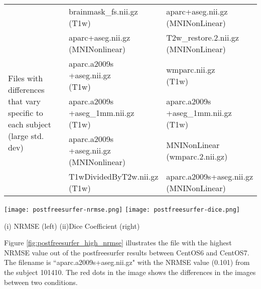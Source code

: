 \begin{center}
\begin{longtable}{|p{}|p{}|p{}|}
& \makecell[l]{brainmask\_fs.nii.gz\\(T1w)}  & \makecell[l]{aparc+aseg.nii.gz\\(MNINonLinear)} \\\cline{1-3}
\multirow{5}{.3\textwidth}{Files with differences that vary specific to each subject (large std. dev)}   & \makecell[l]{aparc+aseg.nii.gz\\(MNINonlinear)}  & \makecell[l]{T2w\_restore.2.nii.gz\\(MNINonLinear)} \\\cline{2-3}
& \makecell[l]{aparc.a2009s\\+aseg.nii.gz\\(T1w)}                              & \makecell[l]{wmparc.nii.gz\\(T1w)} \\\cline{2-3}
& \makecell[l]{aparc.a2009s\\+aseg\_1mm.nii.gz\\(T1w)}                         & \makecell[l]{aparc.a2009s\\+aseg\_1mm.nii.gz\\(T1w)} \\\cline{2-3}
& \makecell[l]{aparc.a2009s\\+aseg.nii.gz\\(MNINonlinear)}                   & \makecell[l]{MNINonLinear\\(wmparc.2.nii.gz)} \\\cline{2-3}
& \makecell[l]{T1wDividedByT2w.nii.gz\\(T1w)}                                & \makecell[l]{aparc.a2009s+aseg.nii.gz\\(MNINonLinear)} \\\cline{1-3}
\end{longtable}
\label{tab:PostFreeSurfer_comparison_table}
\end{center}
\hfill \break

\begin{center}
\texttt{[image: postfreesurfer-nrmse.png]}%
\texttt{[image: postfreesurfer-dice.png]}
\caption*{(i) NRMSE (left) (ii)Dice Coefficient (right)}
\label{fig:postfreesurfer_metric_values}
\end{center}

Figure \ref{fig:postfreesurfer_high_nrmse} illustrates the file with the highest NRMSE value out of the postfreesurfer results between CentOS6 and CentOS7. The filename is ``aparc.a2009s+aseg.nii.gz" with the NRMSE value (0.101) from the subject 101410. The red dots in the image shows the differences in the images between two conditions.

